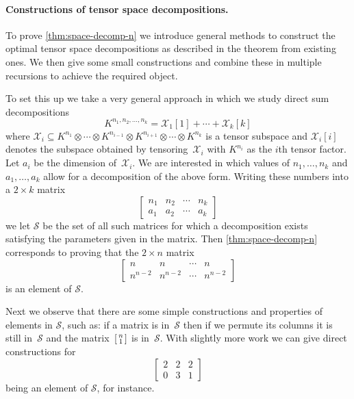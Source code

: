 \documentclass[10pt,a4paper]{article}
\theoremstyle{definition}
\theoremstyle{remark}
\begin{document}
\paragraph{Constructions of tensor space decompositions.}

To prove 
\autoref{thm:space-decomp-n} we introduce general methods to construct the optimal tensor space decompositions as described in the theorem from existing ones. We then give some small constructions and combine these in multiple recursions to achieve the required object.

To set this up we take a very general approach in which we study direct sum decompositions 
\[
K^{n_1, n_2, \ldots, n_k} = \mathcal{X}_1[1] + \cdots + \mathcal{X}_k[k]
\]
where $\mathcal{X}_i \subseteq K^{n_1} \otimes \cdots \otimes K^{n_{i-1}} \otimes K^{n_{i+1}} \otimes \cdots \otimes K^{n_k}$ is a tensor subspace and $\mathcal{X}_i[i]$ denotes the subspace obtained by tensoring~$\mathcal{X}_i$ with $K^{n_i}$ as the $i$th tensor factor. Let $a_i$ be the dimension of~$\mathcal{X}_i$. We are interested in which values of $n_1, \ldots, n_k$ and $a_1, \ldots, a_k$ allow for a decomposition of the above form. Writing these numbers into a $2\times k$ matrix
\[
\begin{bmatrix} n_1 & n_2 & \cdots & n_k\\a_1 & a_2  & \cdots & a_k\end{bmatrix}
\]
we let $\mathcal{S}$ be the set of all such matrices for which a decomposition exists satisfying the parameters given in the matrix. Then \autoref{thm:space-decomp-n} corresponds to proving that the $2 \times n$ matrix
\begin{equation}\label{eq:base-case-n-intro}
\begin{bmatrix} n & n & \cdots & n\\n^{n-2} & n^{n-2}  & \cdots & n^{n-2}\end{bmatrix}
\end{equation}
is an element of $\mathcal{S}$. 

Next we observe that there are some simple constructions and properties of elements in $\mathcal{S}$, such as: if a matrix is in~$\mathcal{S}$ then if we permute its columns it is still in~$\mathcal{S}$ and the matrix~$\begin{bsmallmatrix} n\\1 \end{bsmallmatrix}$ is in~$\mathcal{S}$. With slightly more work we can give direct constructions for
\begin{equation}\label{eq:base-case-intro}
\begin{bmatrix} 2 & 2 & 2\\0 & 3 & 1\end{bmatrix}
\end{equation}
being an element of $\mathcal{S}$, for instance.
\end{document}
